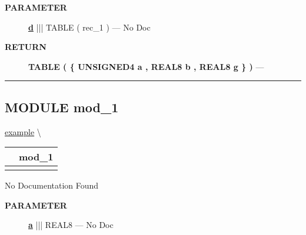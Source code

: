 \par
\begin{description}
\item [\colorbox{tagtype}{\color{white} \textbf{\textsf{PARAMETER}}}] \textbf{\underline{d}} ||| TABLE ( rec\_1 ) --- No Doc
\end{description}







\par
\begin{description}
\item [\colorbox{tagtype}{\color{white} \textbf{\textsf{RETURN}}}] \textbf{TABLE ( \{ UNSIGNED4 a , REAL8 b , REAL8 g \} )} --- 
\end{description}




\rule{\linewidth}{0.5pt}
\subsection*{\textsf{\colorbox{headtoc}{\color{white} MODULE}
mod\_1}}

\hypertarget{ecldoc:example.mod_1}{}
\hspace{0pt} \hyperlink{ecldoc:example}{example} \textbackslash 

{\renewcommand{\arraystretch}{1.5}
\begin{tabularx}{\textwidth}{|>{\raggedright\arraybackslash}l|X|}
\hline
\hspace{0pt}\mytexttt{\color{red} } & \textbf{mod\_1} \\
\hline
\multicolumn{2}{|>{\raggedright\arraybackslash}X|}{\hspace{0pt}\mytexttt{\color{param} (REAL8 a)}} \\
\hline
\end{tabularx}
}

\par





No Documentation Found






\par
\begin{description}
\item [\colorbox{tagtype}{\color{white} \textbf{\textsf{PARAMETER}}}] \textbf{\underline{a}} ||| REAL8 --- No Doc
\end{description}






